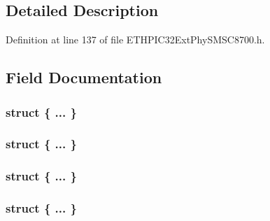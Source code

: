 \subsection{Detailed Description}


Definition at line 137 of file E\+T\+H\+P\+I\+C32\+Ext\+Phy\+S\+M\+S\+C8700.\+h.



\subsection{Field Documentation}
\hypertarget{union_____s_y_m_b_o_l_e_r_r_c_n_tbits__t_a1b58c2893a002465b7680cd6cfcf565b}{}\subsubsection[{"@224}]{\setlength{\rightskip}{0pt plus 5cm}struct \{ ... \} }\label{union_____s_y_m_b_o_l_e_r_r_c_n_tbits__t_a1b58c2893a002465b7680cd6cfcf565b}
\hypertarget{union_____s_y_m_b_o_l_e_r_r_c_n_tbits__t_a05b3eaf7bd5be6b55e45fdf4a550a796}{}\subsubsection[{"@226}]{\setlength{\rightskip}{0pt plus 5cm}struct \{ ... \} }\label{union_____s_y_m_b_o_l_e_r_r_c_n_tbits__t_a05b3eaf7bd5be6b55e45fdf4a550a796}
\hypertarget{union_____s_y_m_b_o_l_e_r_r_c_n_tbits__t_abd07c9e702e4cf358e2ce31607c72e43}{}\subsubsection[{"@252}]{\setlength{\rightskip}{0pt plus 5cm}struct \{ ... \} }\label{union_____s_y_m_b_o_l_e_r_r_c_n_tbits__t_abd07c9e702e4cf358e2ce31607c72e43}
\hypertarget{union_____s_y_m_b_o_l_e_r_r_c_n_tbits__t_ab8ac160f4eca7e1cc23ce370d1812294}{}\subsubsection[{"@254}]{\setlength{\rightskip}{0pt plus 5cm}struct \{ ... \} }\label{union_____s_y_m_b_o_l_e_r_r_c_n_tbits__t_ab8ac160f4eca7e1cc23ce370d1812294}
\hypertarget{union_____s_y_m_b_o_l_e_r_r_c_n_tbits__t_ace632af6668e7ddb8dfcefca6dcac346}{}
